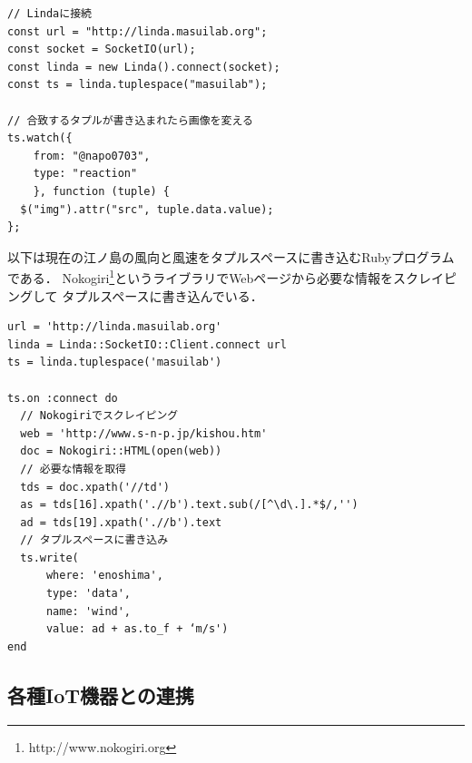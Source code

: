 \vspace{2mm}
\begin{lstlisting}
// Lindaに接続
const url = "http://linda.masuilab.org";
const socket = SocketIO(url);
const linda = new Linda().connect(socket);
const ts = linda.tuplespace("masuilab");

// 合致するタプルが書き込まれたら画像を変える
ts.watch({
    from: "@napo0703",
    type: "reaction"
    }, function (tuple) {
  $("img").attr("src", tuple.data.value);
};
\end{lstlisting}
\vspace{4mm}

以下は現在の江ノ島の風向と風速をタプルスペースに書き込むRubyプログラムである．
Nokogiri\footnote{http://www.nokogiri.org}というライブラリでWebページから必要な情報をスクレイピングして
タプルスペースに書き込んでいる．

\vspace{2mm}
\begin{lstlisting}
url = 'http://linda.masuilab.org'
linda = Linda::SocketIO::Client.connect url
ts = linda.tuplespace('masuilab')

ts.on :connect do
  // Nokogiriでスクレイピング
  web = 'http://www.s-n-p.jp/kishou.htm'
  doc = Nokogiri::HTML(open(web))
  // 必要な情報を取得
  tds = doc.xpath('//td')
  as = tds[16].xpath('.//b').text.sub(/[^\d\.].*$/,'')
  ad = tds[19].xpath('.//b').text
  // タプルスペースに書き込み
  ts.write(
      where: 'enoshima',
      type: 'data',
      name: 'wind',
      value: ad + as.to_f + ‘m/s')
end
\end{lstlisting}

\subsection{各種IoT機器との連携}
